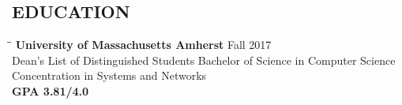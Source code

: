 \documentclass{res}
\begin{document}
 
\begin{resume}
\section{EDUCATION}
	\vspace{-0.1in}
	\begin{tabbing}
		\hspace{2.3in}\= \hspace{2.6in}\= \kill %
		{\bf University of Massachusetts Amherst} \>\> Fall 2017\\
		Dean's List of Distinguished Students
		Bachelor of Science in Computer Science \\
		Concentration in Systems and Networks \\
		{\bf GPA 3.81/4.0}    
	\end{tabbing}
\vspace{-0.3in}

\end{resume}
\end{document}
